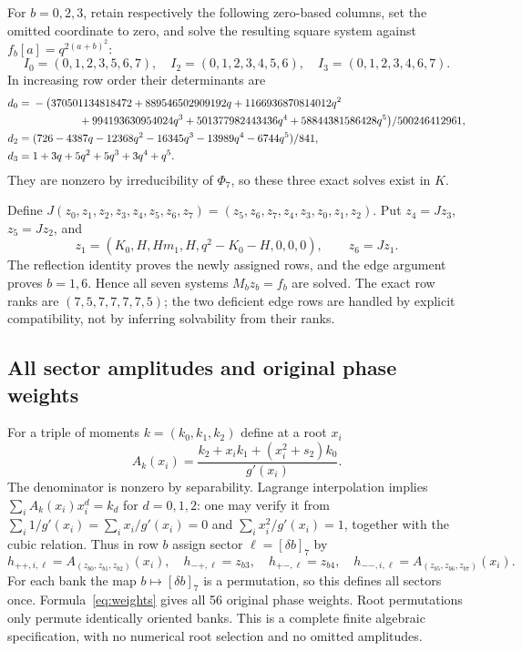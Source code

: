 \documentclass[11pt,letterpaper]{article}
\theoremstyle{definition}\newtheorem{definition}[theorem]{Definition}
\begin{document}
For $b=0,2,3$, retain respectively the following zero-based columns, set the omitted coordinate to zero, and solve the resulting square system against $f_b[a]=q^{2(a+b)^2}$:
\[
 I_0=(0,1,2,3,5,6,7),\quad
 I_2=(0,1,2,3,4,5,6),\quad
 I_3=(0,1,2,3,4,6,7).
\]
In increasing row order their determinants are
\begin{align*}
 d_0={}&-\bigl(370501134818472+889546502909192q
 +1166936870814012q^2\\
 &\hspace{15mm}+994193630954024q^3+501377982443436q^4
 +58844381586428q^5\bigr)/500246412961,\\
 d_2={}&(726-4387q-12368q^2-16345q^3-13989q^4-6744q^5)/841,\\
 d_3={}&1+3q+5q^2+5q^3+3q^4+q^5.
\end{align*}
They are nonzero by irreducibility of $\Phi_7$, so these three exact solves exist in $K$.

Define $J(z_0,z_1,z_2,z_3,z_4,z_5,z_6,z_7)
=(z_5,z_6,z_7,z_4,z_3,z_0,z_1,z_2)$. Put $z_4=Jz_3$, $z_5=Jz_2$, and
\[
 z_1=(K_0,H,Hm_1,H,q^2-K_0-H,0,0,0),\qquad z_6=Jz_1.
\]
The reflection identity proves the newly assigned rows, and the edge argument proves $b=1,6$. Hence all seven systems $M_bz_b=f_b$ are solved. The exact row ranks are $(7,5,7,7,7,7,5)$; the two deficient edge rows are handled by explicit compatibility, not by inferring solvability from their ranks.

\subsection{All sector amplitudes and original phase weights}

For a triple of moments $k=(k_0,k_1,k_2)$ define at a root $x_i$
\begin{equation}\label{eq:n7amplitude}
 A_k(x_i)=\frac{k_2+x_ik_1+(x_i^2+s_2)k_0}{g'(x_i)}.
\end{equation}
The denominator is nonzero by separability. Lagrange interpolation implies
$\sum_iA_k(x_i)x_i^d=k_d$ for $d=0,1,2$: one may verify it from
$\sum_i1/g'(x_i)=\sum_ix_i/g'(x_i)=0$ and $\sum_ix_i^2/g'(x_i)=1$, together with the cubic relation. Thus in row $b$ assign sector $\ell=[\delta b]_7$ by
\[
 h_{++,i,\ell}=A_{(z_{b0},z_{b1},z_{b2})}(x_i),\quad
 h_{-+,\ell}=z_{b3},\quad h_{+-,\ell}=z_{b4},\quad
 h_{--,i,\ell}=A_{(z_{b5},z_{b6},z_{b7})}(x_i).
\]
For each bank the map $b\mapsto[\delta b]_7$ is a permutation, so this defines all sectors once. Formula~\eqref{eq:weights} gives all 56 original phase weights. Root permutations only permute identically oriented banks. This is a complete finite algebraic specification, with no numerical root selection and no omitted amplitudes.
\end{document}
